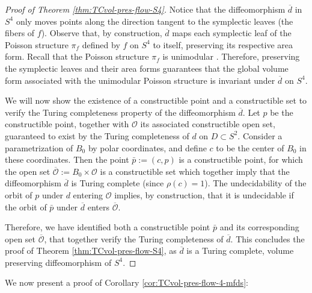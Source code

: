 \documentclass{amsart}
\begin{document}
\begin{proof}[Proof of Theorem \ref{thm:TCvol-pres-flow-S4}]
 Notice that the diffeomorphism $\overline{d}$ in $S^4$ only moves points along the direction tangent to the symplectic leaves (the fibers of $f$). 
 Observe that, by construction, $\overline{d}$ maps each symplectic leaf of the Poisson structure $\pi_{f}$ defined by $f$ on $S^4$ to itself, preserving its respective area form.
 Recall that the Poisson structure $\pi_{f}$ is unimodular \cite{GSV15, BV21}.
 Therefore, preserving the symplectic leaves and their area forms guarantees that the global volume form associated with the unimodular Poisson structure is invariant under $\overline{d}$ on $S^{4}$.

 We will now show the existence of a constructible point and a constructible set to verify the Turing completeness property of the diffeomorphism $\overline{d}$.
 Let $p$ be the constructible point, together with $\mathcal{O}$ its associated constructible open set, guaranteed to exist by the Turing completeness of $d$ on $D\subset S^2$.
 Consider a parametrization of $B_0$ by polar coordinates, and define $c$ to be the center of $B_0$ in these coordinates. 
 Then the point $\bar{p}:= (c,p)$ is a constructible point, for which the open set $\overline{\mathcal{O}}:= B_0 \times \mathcal{O}$ is a constructible set which together imply that the diffeomorphism $\overline{d}$ is Turing complete (since $\rho(c)=1$).
 The undecidability of the orbit of $p$ under $d$ entering $\mathcal{O}$ implies, by construction, that it is undecidable if the orbit of $\bar{p}$ under $\overline{d}$ enters $\overline{\mathcal{O}}$.

 Therefore, we have identified both a constructible point $\bar{p}$ and its corresponding open set $\overline{\mathcal{O}}$, that together verify the Turing completeness of $\overline{d}$.
 This concludes the proof of Theorem \ref{thm:TCvol-pres-flow-S4}, as $\overline{d}$ is a Turing complete, volume preserving diffeomorphism of $S^4$.
\end{proof}


We now present a proof of Corollary \ref{cor:TCvol-pres-flow-4-mfds}:
\end{document}
